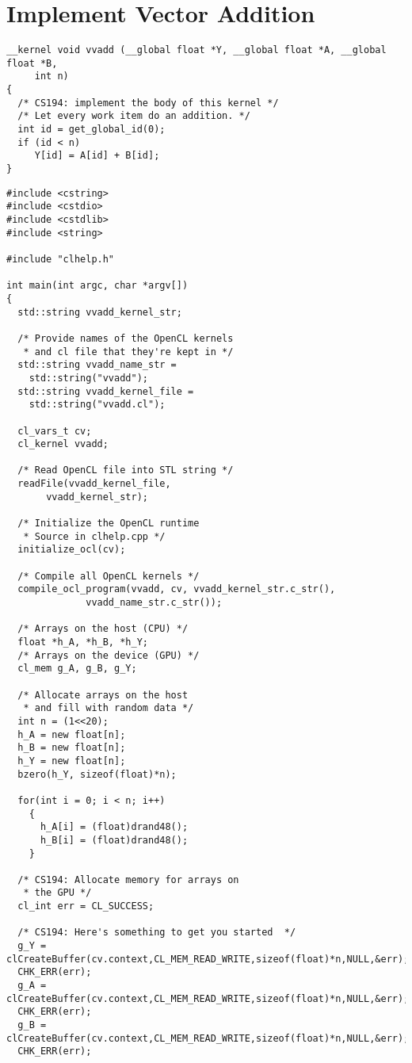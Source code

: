 \documentclass[11pt,letter]{article}
\begin{document}
\section{Implement Vector Addition}

\begin{lstlisting}[label=some-code,caption=vvadd.cl]
__kernel void vvadd (__global float *Y, __global float *A, __global float *B,
	 int n)
{
  /* CS194: implement the body of this kernel */
  /* Let every work item do an addition. */
  int id = get_global_id(0);
  if (id < n)
     Y[id] = A[id] + B[id];
}
\end{lstlisting}

\begin{lstlisting}[label=some-code,caption=vvadd.cpp]
#include <cstring>
#include <cstdio>
#include <cstdlib>
#include <string>

#include "clhelp.h"

int main(int argc, char *argv[])
{
  std::string vvadd_kernel_str;

  /* Provide names of the OpenCL kernels
   * and cl file that they're kept in */
  std::string vvadd_name_str = 
    std::string("vvadd");
  std::string vvadd_kernel_file = 
    std::string("vvadd.cl");

  cl_vars_t cv; 
  cl_kernel vvadd;

  /* Read OpenCL file into STL string */
  readFile(vvadd_kernel_file,
	   vvadd_kernel_str);
  
  /* Initialize the OpenCL runtime 
   * Source in clhelp.cpp */
  initialize_ocl(cv);
  
  /* Compile all OpenCL kernels */
  compile_ocl_program(vvadd, cv, vvadd_kernel_str.c_str(),
		      vvadd_name_str.c_str());
  
  /* Arrays on the host (CPU) */
  float *h_A, *h_B, *h_Y;
  /* Arrays on the device (GPU) */
  cl_mem g_A, g_B, g_Y;

  /* Allocate arrays on the host
   * and fill with random data */
  int n = (1<<20);
  h_A = new float[n];
  h_B = new float[n];
  h_Y = new float[n];
  bzero(h_Y, sizeof(float)*n);
  
  for(int i = 0; i < n; i++)
    {
      h_A[i] = (float)drand48();
      h_B[i] = (float)drand48();
    }

  /* CS194: Allocate memory for arrays on 
   * the GPU */
  cl_int err = CL_SUCCESS;
  
  /* CS194: Here's something to get you started  */
  g_Y = clCreateBuffer(cv.context,CL_MEM_READ_WRITE,sizeof(float)*n,NULL,&err);
  CHK_ERR(err);
  g_A = clCreateBuffer(cv.context,CL_MEM_READ_WRITE,sizeof(float)*n,NULL,&err);
  CHK_ERR(err);
  g_B = clCreateBuffer(cv.context,CL_MEM_READ_WRITE,sizeof(float)*n,NULL,&err);
  CHK_ERR(err);
  

\end{lstlisting}
\end{document}
